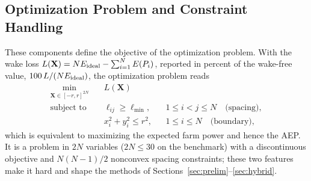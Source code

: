 \subsection{Optimization Problem and Constraint Handling}
\label{sec:constraints}
These components define the objective of the optimization problem. With the wake loss $L(\mathbf X)=N E_{\rm ideal}-\sum_{i=1}^{N}E(P_i)$, reported in percent of the wake-free value, $100\,L/(NE_{\rm ideal})$, the optimization problem reads
\begin{equation}
\begin{aligned}
\min_{\mathbf X\in[-r,r]^{2N}}\quad & L(\mathbf X)\\
\text{subject to}\quad & \ell_{ij}\ge\ell_{\min}, && 1\le i<j\le N \quad \text{(spacing)},\\
& x_i^2+y_i^2\le r^2, && 1\le i\le N \quad \text{(boundary)},
\end{aligned}
\label{eq:wflop}
\end{equation}
which is equivalent to maximizing the expected farm power and hence the AEP. It is a problem in $2N$ variables ($2N\le30$ on the benchmark) with a discontinuous objective and $N(N-1)/2$ nonconvex spacing constraints; these two features make it hard and shape the methods of Sections~\ref{sec:prelim}--\ref{sec:hybrid}.

